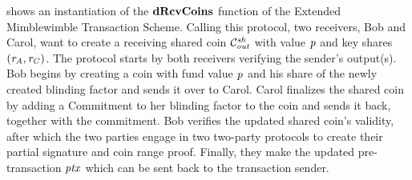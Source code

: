  shows an instantiation of the $\mathbf{dRcvCoins}$ function of the Extended Mimblewimble Transaction Scheme.
Calling this protocol, two receivers, Bob and Carol, want to create a receiving shared coin $\mathcal{C}_{\mathit{out}}^{\mathit{sh}}$ with value $\mathit{p}$ and key shares $(\mathit{r}_{\mathit{A}}, \mathit{r}_{\mathit{C}})$.
The protocol starts by both receivers verifying the sender's output(s).
Bob begins by creating a coin with fund value $\mathit{p}$ and his share of the newly created blinding factor and sends it over to Carol.
Carol finalizes the shared coin by adding a Commitment to her blinding factor to the coin and sends it back, together with the commitment.
Bob verifies the updated shared coin's validity, after which the two parties engage in two two-party protocols to create their partial signature and coin range proof.
Finally, they make the updated pre-transaction $\mathit{ptx}$ which can be sent back to the transaction sender.

